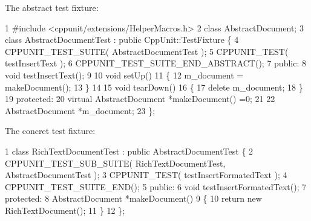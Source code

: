 The abstract test fixture\+: 
\begin{DoxyCode}
1 #include <cppunit/extensions/HelperMacros.h>
2 class AbstractDocument;
3 class AbstractDocumentTest : public CppUnit::TestFixture \{
4   CPPUNIT\_TEST\_SUITE( AbstractDocumentTest );
5   CPPUNIT\_TEST( testInsertText );
6   CPPUNIT\_TEST\_SUITE\_END\_ABSTRACT();
7 public:
8   void testInsertText();
9 
10   void setUp()
11   \{
12     m\_document = makeDocument();
13   \}
14 
15   void tearDown()
16   \{
17     delete m\_document;
18   \}
19 protected:
20   virtual AbstractDocument *makeDocument() =0;
21 
22   AbstractDocument *m\_document;
23 \};
\end{DoxyCode}


The concret test fixture\+: 
\begin{DoxyCode}
1 class RichTextDocumentTest : public AbstractDocumentTest \{
2   CPPUNIT\_TEST\_SUB\_SUITE( RichTextDocumentTest, AbstractDocumentTest );
3   CPPUNIT\_TEST( testInsertFormatedText );
4   CPPUNIT\_TEST\_SUITE\_END();
5 public:
6   void testInsertFormatedText();
7 protected:
8   AbstractDocument *makeDocument()
9   \{
10     return new RichTextDocument();
11   \}
12 \};
\end{DoxyCode}


